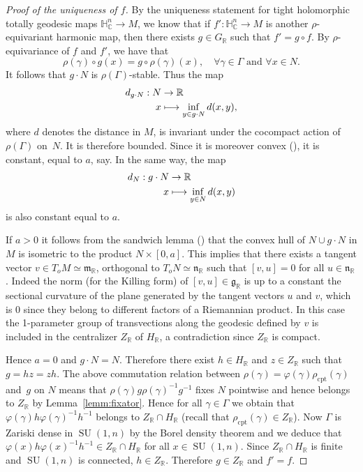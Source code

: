 \documentclass[JEP,XML,SOM,Unicode,NoFloatCountersInSection]{cedram}
\newcommand{\mto}{\mathchoice{\longmapsto}{\mapsto}{\mapsto}{\mapsto}}
\newcommand{\citestar}[3]{\cite[#3]{#1}}
\theoremstyle{plain}
\theoremstyle{definition}
\DeclareMathOperator{\SU}{SU}
\newcommand{\bR}{\mathbb{R}}
\newcommand{\HC}{{\mathbb{H}^n_\mathbb{C}}}
\newcommand{\fgg}{\mathfrak{g}}
\newcommand{\fm}{\mathfrak{m}}
\newcommand{\fn}{\mathfrak{n}}
\newcommand{\rhoc}{\rho_\mathrm{cpt}}
\begin{document}
\begin{proof}[Proof of the uniqueness of $f$]
By the uniqueness statement for tight holomorphic
\hbox{totally} geodesic maps $\HC\to M$, we know that if $f':\HC\to M$ is
another $\rho$-equivariant harmonic map, then there exists $g\in G_\bR$ such that $f'=g\circ f$. By
$\rho$-equivariance of $f$ and $f'$, we have that
$$
\rho(\gamma)\circ g(x)=g\circ\rho(\gamma)(x),\quad\forall \gamma\in\Gamma\mbox{ and }\forall x\in N.
$$
It follows that $g \cdot N$ is $\rho(\Gamma)$-stable.
Thus the map
\begin{align*}
d_{g\cdot N}:N&\to\bR\\ x&\mto \inf_{y \in g \cdot N} d(x,y),
\end{align*}
where
$d$ denotes the distance in
$M$, is invariant under the cocompact action of $\rho(\Gamma)$ on~$N$. It is therefore
bounded. Since it is moreover convex (\citestar{BH}*{p.\,178}), it is constant, equal to $a$, say. In the same way, the map
\begin{align*}
d_N:g\cdot N&\to\bR\\
x&\mto \inf_{y \in N} d(x,y)
\end{align*}
is also constant equal to $a$.

If $a>0$ it follows from the sandwich
lemma (\citestar{BH}*{p.\,182}) that the convex hull of $N\cup g\cdot N$ in $M$ is isometric to the product $N\times
[0,a]$. This implies that there exists a tangent vector $v\in T_oM\simeq \fm_\bR$, orthogonal to
$T_oN\simeq \fn_\bR$ such that $[v,u]=0$ for all $u\in\fn_\bR$. Indeed the
norm (for the Killing form) of $[v,u]\in \fgg_\bR$ is up to a constant the sectional curvature of the
plane generated by the tangent vectors $u$ and $ v$, which is $0$ since they belong to different factors
of a Riemannian product.
In this case the 1-parameter group of transvections along
the geodesic defined by $v$ is included in the centralizer $Z_\bR$ of $H_\bR$, a contradiction since
$Z_\bR$ is compact.

Hence $a=0$ and $g\cdot N=N$. Therefore there exist $h\in H_\bR$ and $z\in Z_\bR$ such
that $g=hz=zh$. The above commutation relation between $\rho(\gamma)=\varphi(\gamma)\rhoc(\gamma)$ and~$g$ on $N$
means that $\rho(\gamma)g\rho(\gamma)^{-1}g^{-1}$ fixes $N$ pointwise and hence belongs to $Z_\bR$ by
Lemma~\ref{lemm:fixator}. Hence for
all $\gamma\in\Gamma$ we obtain that $\varphi(\gamma)h\varphi(\gamma)^{-1}h^{-1}$ belongs to $Z_\bR\cap H_\bR$
(recall that $\rhoc(\gamma) \in Z_\bR$). Now $\Gamma$
is Zariski dense in $\SU(1,n)$ by the Borel density theorem and we deduce that
$\varphi(x)h\varphi(x)^{-1}h^{-1}\in Z_\bR\cap H_\bR$ for all $x\in\SU(1,n)$.
Since $Z_\bR\cap H_\bR$ is finite and
$\SU(1,n)$ is connected, $h\in Z_\bR$. Therefore $g\in Z_\bR$ and $f'=f$.
\end{proof}
\end{document}
